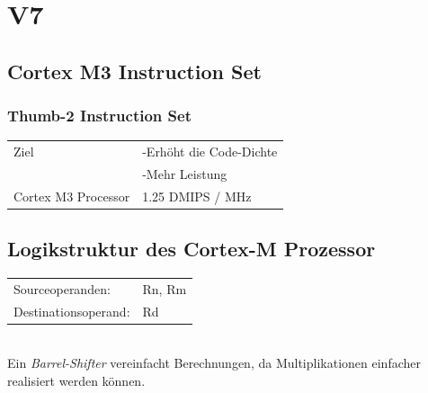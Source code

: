 \section{V7}
\subsection{Cortex M3 Instruction Set}
\begin{multicols}{2}  
\subsubsection{Thumb-2 Instruction Set}
\begin{tabular}{l l}
    Ziel&-Erhöht die Code-Dichte\\
        &  -Mehr Leistung\\ 
  Cortex M3 Processor  & 1.25 DMIPS / MHz\\ 
\end{tabular} 

\begin{minipage}{\textwidth}
\subsection{Logikstruktur des Cortex-M Prozessor}
\begin{tabular}{ll} 
    Sourceoperanden:& Rn, Rm \\ 
    Destinationsoperand:& Rd  \\ 
\end{tabular} \\
Ein \textit{Barrel-Shifter} vereinfacht Berechnungen,\newline
da Multiplikationen einfacher realisiert werden können.
\end{minipage}
\end{multicols}

